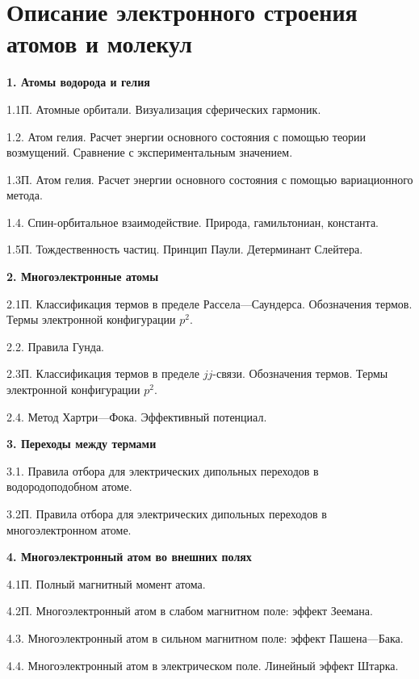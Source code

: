 \setmainfont{Noto Serif}
\setsansfont{Noto Sans}
\setmonofont{Noto Sans Mono}

\newpage
\section[Описание электронного строения атомов и молекул]{\texorpdfstring{Описание электронного строения атомов и молекул}{Описание электронного строения атомов и молекул}}
\textbf{1. Атомы водорода и гелия}\par
1.1П. Атомные орбитали. Визуализация сферических гармоник.\par
1.2. Атом гелия. Расчет энергии основного состояния с помощью теории возмущений. Сравнение с экспериментальным значением.\par
1.3П. Атом гелия. Расчет энергии основного состояния с помощью вариационного метода.\par
1.4. Спин-орбитальное взаимодействие. Природа, гамильтониан, константа.\par
1.5П. Тождественность частиц. Принцип Паули. Детерминант Слейтера.\par
\textbf{2. Многоэлектронные атомы}\par
2.1П. Классификация термов в пределе Рассела—Саундерса. Обозначения термов. Термы электронной конфигурации $p^2$.\par
2.2. Правила Гунда.\par
2.3П. Классификация термов в пределе $jj$-связи. Обозначения термов. Термы электронной конфигурации $p^2$.\par
2.4. Метод Хартри—Фока. Эффективный потенциал.\par
\textbf{3. Переходы между термами}\par
3.1. Правила отбора для электрических дипольных переходов в водородоподобном атоме.\par
3.2П. Правила отбора для электрических дипольных переходов в многоэлектронном атоме.\par
\textbf{4. Многоэлектронный атом во внешних полях}\par
4.1П. Полный магнитный момент атома.\par
4.2П. Многоэлектронный атом в слабом магнитном поле: эффект Зеемана.\par
4.3. Многоэлектронный атом в сильном магнитном поле: эффект \mbox{Пашена—Бака}.\par
4.4. Многоэлектронный атом в электрическом поле. Линейный эффект Штарка.\par
\par
